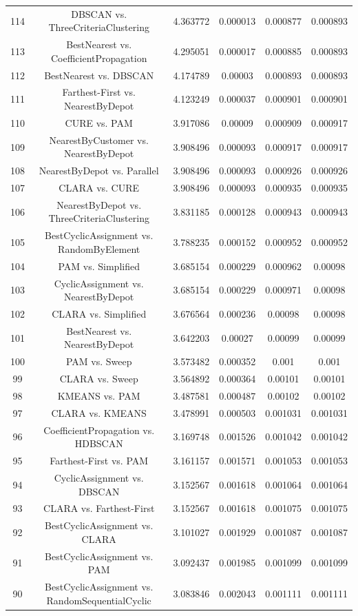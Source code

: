 \documentclass[a4paper,10pt]{article}
\begin{document}
\begin{landscape}
\begin{table}[!htp]
\begin{tabular}{cccccc}
114&DBSCAN vs. ThreeCriteriaClustering&4.363772&0.000013&0.000877&0.000893\\
113&BestNearest vs. CoefficientPropagation&4.295051&0.000017&0.000885&0.000893\\
112&BestNearest vs. DBSCAN&4.174789&0.00003&0.000893&0.000893\\
111&Farthest-First vs. NearestByDepot&4.123249&0.000037&0.000901&0.000901\\
110&CURE vs. PAM&3.917086&0.00009&0.000909&0.000917\\
109&NearestByCustomer vs. NearestByDepot&3.908496&0.000093&0.000917&0.000917\\
108&NearestByDepot vs. Parallel&3.908496&0.000093&0.000926&0.000926\\
107&CLARA vs. CURE&3.908496&0.000093&0.000935&0.000935\\
106&NearestByDepot vs. ThreeCriteriaClustering&3.831185&0.000128&0.000943&0.000943\\
105&BestCyclicAssignment vs. RandomByElement&3.788235&0.000152&0.000952&0.000952\\
104&PAM vs. Simplified&3.685154&0.000229&0.000962&0.00098\\
103&CyclicAssignment vs. NearestByDepot&3.685154&0.000229&0.000971&0.00098\\
102&CLARA vs. Simplified&3.676564&0.000236&0.00098&0.00098\\
101&BestNearest vs. NearestByDepot&3.642203&0.00027&0.00099&0.00099\\
100&PAM vs. Sweep&3.573482&0.000352&0.001&0.001\\
99&CLARA vs. Sweep&3.564892&0.000364&0.00101&0.00101\\
98&KMEANS vs. PAM&3.487581&0.000487&0.00102&0.00102\\
97&CLARA vs. KMEANS&3.478991&0.000503&0.001031&0.001031\\
96&CoefficientPropagation vs. HDBSCAN&3.169748&0.001526&0.001042&0.001042\\
95&Farthest-First vs. PAM&3.161157&0.001571&0.001053&0.001053\\
94&CyclicAssignment vs. DBSCAN&3.152567&0.001618&0.001064&0.001064\\
93&CLARA vs. Farthest-First&3.152567&0.001618&0.001075&0.001075\\
92&BestCyclicAssignment vs. CLARA&3.101027&0.001929&0.001087&0.001087\\
91&BestCyclicAssignment vs. PAM&3.092437&0.001985&0.001099&0.001099\\
90&BestCyclicAssignment vs. RandomSequentialCyclic&3.083846&0.002043&0.001111&0.001111\\

\end{tabular}
\end{table}
\end{landscape}
\end{document}

